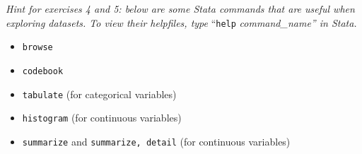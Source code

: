\documentclass{tufte-handout}
\begin{document}
\vspace{.5cm}
\noindent
\textit{Hint for exercises 4 and 5: below are some Stata commands that are useful when exploring datasets. To view their helpfiles, type} ``\texttt{help}\textit{ command\_name'' in Stata.}
\begin{itemize}
	\item \texttt{browse}
	\item \texttt{codebook}
	\item \texttt{tabulate} (for categorical variables)
	\item \texttt{histogram} (for continuous variables)
	\item \texttt{summarize} and \texttt{summarize, detail} (for continuous variables)
\end{itemize}
\end{document}
